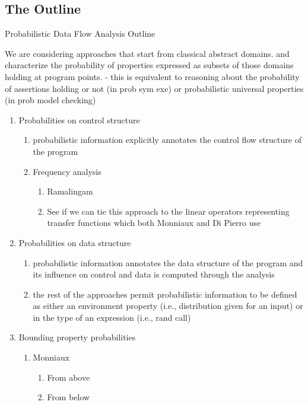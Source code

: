 \subsection{The Outline}

Probabilistic Data Flow Analysis Outline

We are considering approaches that start from classical abstract domains.
and characterize the probability of properties expressed as subsets
of those domains holding at program points.
  - this is equivalent to reasoning about the probability of assertions
    holding or not (in prob sym exe) or probabilistic universal properties
    (in prob model checking) 

\begin{enumerate}

 \item Probabilities on control structure
   \begin{enumerate}
    \item probabilistic information explicitly annotates the control flow
    structure of the program
    \item Frequency analysis
      \begin{enumerate}
       \item Ramalingam
       \item See if we can tie this approach to the linear
  	  operators representing transfer functions
  	  which both Monniaux and Di Pierro use
      \end{enumerate}
   \end{enumerate}

 \item Probabilities on data structure
   \begin{enumerate}
    \item probabilistic information annotates the data structure of the
    program and its influence on control and data is computed through
    the analysis
    \item the rest of the approaches permit probabilistic information to
    be defined as either an environment property (i.e., distribution
    given for an input) or in the type of an expression (i.e., rand call)
   \end{enumerate}

 \item Bounding property probabilities
   \begin{enumerate}
    \item Monniaux
      \begin{enumerate}
       \item From above
       \item From below
      \end{enumerate}
   \end{enumerate}


\end{enumerate}
